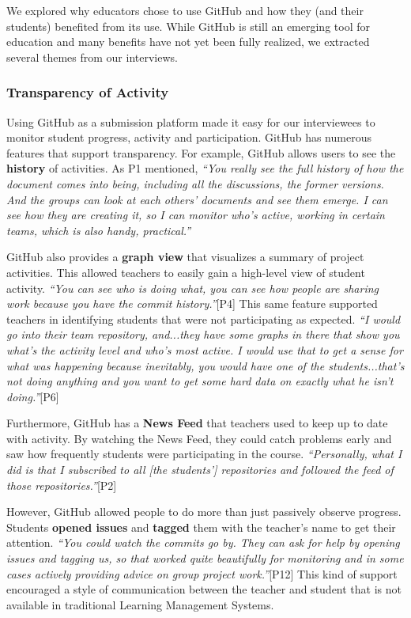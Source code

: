 We explored why educators chose to use GitHub and how they (and their students) benefited from its use. While GitHub is still an emerging tool for education and many benefits have not yet been fully realized, we extracted several themes from our interviews.

\subsubsection{Transparency of Activity}
Using GitHub as a submission platform made it easy for our interviewees to monitor student progress, activity and participation. GitHub has numerous features that support transparency. For example, GitHub allows users to see the \textbf{history} of activities. As P1 mentioned, \textit{``You really see the full history of how the document comes into being, including all the discussions, the former versions. And the groups can look at each others' documents and see them emerge. I can see how they are creating it, so I can monitor who's active, working in certain teams, which is also handy, practical.''}

GitHub also provides a \textbf{graph view} that visualizes a summary of project activities. This allowed teachers to easily gain a high-level view of student activity. \textit{``You can see who is doing what, you can see how people are sharing work because you have the commit history.''}[P4] This same feature supported teachers in identifying students that were not participating as expected. \textit{``I would go into their team repository, and...they have some graphs in there that show you what's the activity level and who's most active. I would use that to get a sense for what was happening because inevitably, you would have one of the students...that's not doing anything and you want to get some hard data on exactly what he isn't doing.''}[P6]

Furthermore, GitHub has a \textbf{News Feed} that teachers used to keep up to date with activity. By watching the News Feed, they could catch problems early and saw how frequently students were participating in the course. \textit{``Personally, what I did is that I subscribed to all [the students'] repositories and followed the feed of those repositories.''}[P2]

However, GitHub allowed people to do more than just passively observe progress. Students \textbf{opened issues} and \textbf{tagged} them with the teacher's name to get their attention. \textit{``You could watch the commits go by. They can ask for help by opening issues and tagging us, so that worked quite beautifully for monitoring and in some cases actively providing advice on group project work.''}[P12] This kind of support encouraged a style of communication between the teacher and student that is not available in traditional Learning Management Systems.

